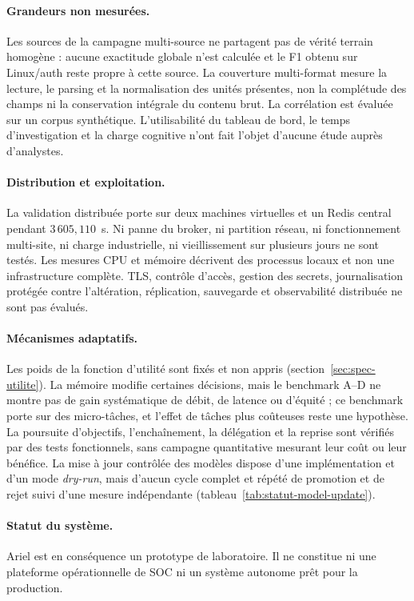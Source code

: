 \paragraph{Grandeurs non mesurées.}
Les sources de la campagne multi-source ne partagent pas de vérité terrain
homogène : aucune exactitude globale n'est calculée et le F1 obtenu sur
Linux/auth reste propre à cette source. La couverture multi-format mesure la
lecture, le parsing et la normalisation des unités présentes, non la
complétude des champs ni la conservation intégrale du contenu brut. La
corrélation est évaluée sur un corpus synthétique. L'utilisabilité du tableau
de bord, le temps d'investigation et la charge cognitive n'ont fait l'objet
d'aucune étude auprès d'analystes.

\paragraph{Distribution et exploitation.}
La validation distribuée porte sur deux machines virtuelles et un Redis
central pendant $3\,605{,}110$~s. Ni panne du broker, ni partition réseau, ni
fonctionnement multi-site, ni charge industrielle, ni vieillissement sur
plusieurs jours ne sont testés. Les mesures CPU et mémoire décrivent des
processus locaux et non une infrastructure complète. TLS, contrôle d'accès,
gestion des secrets, journalisation protégée contre l'altération, réplication,
sauvegarde et observabilité distribuée ne sont pas évalués.

\paragraph{Mécanismes adaptatifs.}
Les poids de la fonction d'utilité sont fixés et non appris
(section~\ref{sec:spec-utilite}). La mémoire modifie certaines décisions, mais
le benchmark A--D ne montre pas de gain systématique de débit, de latence ou
d'équité ; ce benchmark porte sur des micro-tâches, et l'effet de tâches plus
coûteuses reste une hypothèse. La poursuite d'objectifs, l'enchaînement, la
délégation et la reprise sont vérifiés par des tests fonctionnels, sans
campagne quantitative mesurant leur coût ou leur bénéfice. La mise à jour
contrôlée des modèles dispose d'une implémentation et d'un mode
\textit{dry-run}, mais d'aucun cycle complet et répété de promotion et de
rejet suivi d'une mesure indépendante (tableau~\ref{tab:statut-model-update}).

\paragraph{Statut du système.}
Ariel \logminer{} est en conséquence un prototype de laboratoire. Il ne
constitue ni une plateforme opérationnelle de SOC ni un système autonome prêt
pour la production.
